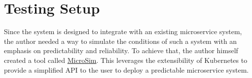 \section{Testing Setup}

Since the system is designed to integrate with an existing microservice system, the author needed a way to simulate the conditions of such a system with an emphasis on predictability and reliability. To achieve that, the author himself created a tool called \href{https://github.com/MrSupiri/MicroSim}{MicroSim}. This leverages the extensibility of Kubernetes to provide a simplified API to the user to deploy a predictable microservice system.

